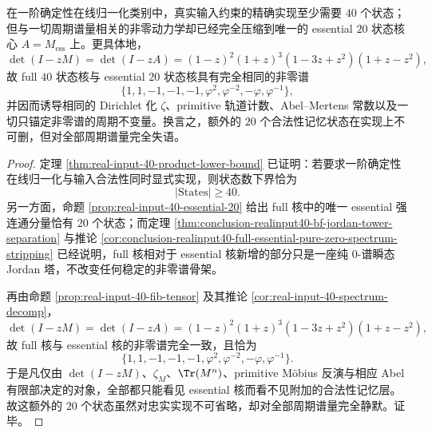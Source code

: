 \begin{theorem}[合法性记忆层对周期谱量的完全失语]\label{thm:conclusion-realinput40-legality-memory-spectral-aphasia}
在一阶确定性在线归一化类别中，真实输入约束的精确实现至少需要 \(40\) 个状态；但与一切周期谱量相关的非零动力学却已经完全压缩到唯一的 essential \(20\) 状态核心 \(A=M_{\mathrm{ess}}\) 上。更具体地，
\[
\det(I-zM)=\det(I-zA)
=(1-z)^2(1+z)^3(1-3z+z^2)(1+z-z^2),
\]
故 full \(40\) 状态核与 essential \(20\) 状态核具有完全相同的非零谱
\[
\{1,1,-1,-1,-1,\varphi^2,\varphi^{-2},-\varphi,\varphi^{-1}\},
\]
并因而诱导相同的 Dirichlet 化 \(\zeta\)、primitive 轨道计数、Abel--Mertens 常数以及一切只锚定非零谱的周期不变量。换言之，额外的 \(20\) 个合法性记忆状态在实现上不可删，但对全部周期谱量完全失语。
\end{theorem}
\begin{proof}
定理 \ref{thm:real-input-40-product-lower-bound} 已证明：若要求一阶确定性在线归一化与输入合法性同时显式实现，则状态数下界恰为
\[
|\mathrm{States}|\ge 40.
\]
另一方面，命题 \ref{prop:real-input-40-essential-20} 给出 full 核中的唯一 essential 强连通分量恰有 \(20\) 个状态；而定理 \ref{thm:conclusion-realinput40-bf-jordan-tower-separation} 与推论 \ref{cor:conclusion-realinput40-full-essential-pure-zero-spectrum-stripping} 已经说明，full 核相对于 essential 核新增的部分只是一座纯 \(0\)-谱瞬态 Jordan 塔，不改变任何稳定的非零谱骨架。

再由命题 \ref{prop:real-input-40-fib-tensor} 及其推论 \ref{cor:real-input-40-spectrum-decomp}，
\[
\det(I-zM)=\det(I-zA)
=(1-z)^2(1+z)^3(1-3z+z^2)(1+z-z^2),
\]
故 full 核与 essential 核的非零谱完全一致，且恰为
\[
\{1,1,-1,-1,-1,\varphi^2,\varphi^{-2},-\varphi,\varphi^{-1}\}.
\]
于是凡仅由 \(\det(I-zM)\)、\(\zeta_M\)、\(\Tr(M^n)\)、primitive Möbius 反演与相应 Abel 有限部决定的对象，全部都只能看见 essential 核而看不见附加的合法性记忆层。故这额外的 \(20\) 个状态虽然对忠实实现不可省略，却对全部周期谱量完全静默。证毕。
\end{proof}

\endinput
